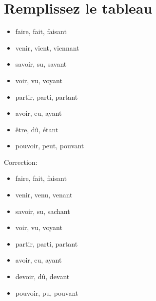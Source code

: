 \documentclass{book}
\begin{document}
    \section{Remplissez le tableau}
        \begin{itemize}
            \item faire, fait, faisant
            \item venir, vient, viennant
            \item savoir, su, savant
            \item voir, vu, voyant
            \item partir, parti, partant
            \item avoir, eu, ayant
            \item être, dû, étant
            \item pouvoir, peut, pouvant
        \end{itemize}
        Correction:
        \begin{itemize}
            \item faire, fait, faisant
            \item venir, venu, venant
            \item savoir, su, sachant
            \item voir, vu, voyant
            \item partir, parti, partant
            \item avoir, eu, ayant
            \item devoir, dû, devant
            \item pouvoir, pu, pouvant
        \end{itemize}
\end{document}
